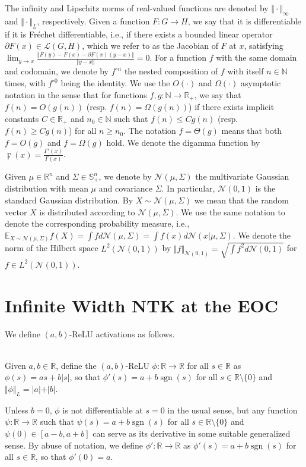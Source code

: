 \documentclass[twoside,11pt]{article}
\newcommand{\R}{\mathbb{R}}
\newcommand{\N}{\mathbb{N}}
\newcommand{\E}{\mathbb{E}}
\newcommand{\Ell}{\mathcal{L}}
\DeclareMathOperator{\sgn}{sgn}
\begin{document}
The infinity and Lipschitz norms of real-valued functions are denoted by $\Vert \cdot \Vert_\infty$ and $\Vert \cdot \Vert_L$, respectively. Given a function $F:G \to H$, we say that it is differentiable if it is Fr\'echet differentiable, i.e., if there exists a bounded linear operator $\partial F(x) \in \Ell(G,H)$, which we refer to as the Jacobian of $F$ at $x$, satisfying $\lim_{y \to x }\frac{\Vert F(y) - F(x) - \partial F(x) (y - x) \Vert}{\Vert y - x \Vert}=0$. For a function $f$ with the same domain and codomain, we denote by $f^{\circ n}$ the nested composition of $f$ with itself $n \in \N$ times, with $f^{\circ 0}$ being the identity. We use the $O(\cdot)$ and $\Omega(\cdot)$ asymptotic notation in the sense that for functions $f,g : \N \to \R_+$, we say that $f(n) = O(g(n))$ (resp. $f(n) = \Omega(g(n))$) if there exists implicit constants $C \in \R_+$ and $n_0 \in \N$ such that $f(n) \leq C g(n)$ (resp. $f(n) \geq C g(n)$) for all $n \geq n_0$. The notation $f = \Theta(g)$ means that both $f=O(g)$ and $f=\Omega(g)$ hold. We denote the digamma function by $\digamma(x)=\frac{\Gamma'(x)}{\Gamma(x)}$.

Given $\mu \in \R^n$ and $\Sigma \in \mathbb{S}^n_+$, we denote by $\mathcal{N}\left(\mu,\Sigma\right)$ the multivariate Gaussian distribution with mean $\mu$ and covariance $\Sigma$. In particular, $\mathcal{N}(0,1)$ is the standard Gaussian distribution. By $X \sim \mathcal{N}(\mu, \Sigma)$ we mean that the random vector $X$ is distributed according to $\mathcal{N}(\mu, \Sigma)$. We use the same notation to denote the corresponding probability measure, i.e., $\E_{X \sim \mathcal{N}(\mu, \Sigma)} f(X) = \int f d\mathcal{N}(\mu, \Sigma) = \int f(x) d\mathcal{N}(x \vert \mu, \Sigma)$. We denote the norm of the Hilbert space $L^2(\mathcal{N}(0,1))$ by $\Vert f \Vert_{\mathcal{N}(0,1)} = \sqrt{\int f^2 d\mathcal{N}(0,1)}$ for $f \in L^2(\mathcal{N}(0,1))$.

\section{Infinite Width NTK at the EOC}\label{limiting_ntk}

We define $(a,b)$-ReLU activations as follows.

\begin{definition}[$(a,b)$-ReLU]~\\
Given $a,b \in \R$, define the $(a,b)$-ReLU $\phi : \R \to \R$ for all $s \in \R$ as $\phi(s) = as + b\vert s \vert$, so that $\phi'(s) = a + b \sgn(s)$ for all $s \in \R \setminus \{ 0 \}$ and $\Vert \phi \Vert_L = \vert a \vert + \vert b \vert$.
\end{definition}
Unless $b=0$, $\phi$ is not differentiable at $s=0$ in the usual sense, but any function $\psi : \R \to \R$ such that $\psi(s) = a + b \sgn(s)$ for all $s \in \R \setminus \{ 0 \}$ and $\psi(0) \in [a-b,a+b]$ can serve as its derivative in some suitable generalized sense. By abuse of notation, we define $\phi': \R \to \R$ as $\phi'(s) = a + b \sgn(s)$ for all $s \in \R$, so that $\phi'(0) = a$.
\end{document}
